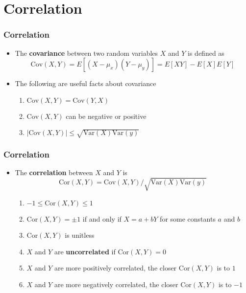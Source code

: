 \documentclass[aspectratio=169]{beamer}
\newcommand{\Cov}{\mathrm{Cov}}
\newcommand{\Var}{\mathrm{Var}}
\newcommand{\Cor}{\mathrm{Cor}}
\begin{document}
\section{Correlation}
\begin{frame}\frametitle{Correlation}
  \begin{itemize}
  \item The {\bf covariance} between two random variables $X$ and $Y$ is defined
    as 
    $$
    \Cov(X, Y) = E[(X - \mu_x)(Y - \mu_y)] = E[X Y] - E[X]E[Y]
    $$
  \item The following are useful facts about covariance
    \begin{enumerate}
    \item $\Cov(X, Y) = \Cov(Y, X)$
    \item $\Cov(X, Y)$ can be negative or positive
    \item $|\Cov(X, Y)| \leq \sqrt{\Var(X) \Var(y)}$
    \end{enumerate}
  \end{itemize}
\end{frame}

\begin{frame}\frametitle{Correlation}
  \begin{itemize}
  \item The {\bf correlation} between $X$ and $Y$ is 
    $$
    \Cor(X, Y) = \Cov(X, Y) / \sqrt{\Var(X) \Var(y)}
    $$
    \begin{enumerate}
    \item $-1 \leq \Cor(X, Y) \leq 1$
    \item $\Cor(X, Y) = \pm 1$ if and only if $X = a + bY$ for some constants $a$ and $b$
    \item $\Cor(X, Y)$ is unitless
    \item $X$ and $Y$ are {\bf uncorrelated} if $\Cor(X, Y) = 0$ 
    \item $X$ and $Y$ are more positively correlated, the closer $\Cor(X,Y)$ is to $1$
    \item $X$ and $Y$ are more negatively correlated, the closer $\Cor(X,Y)$ is to $-1$
    \end{enumerate}
  \end{itemize}
\end{frame}
\end{document}
